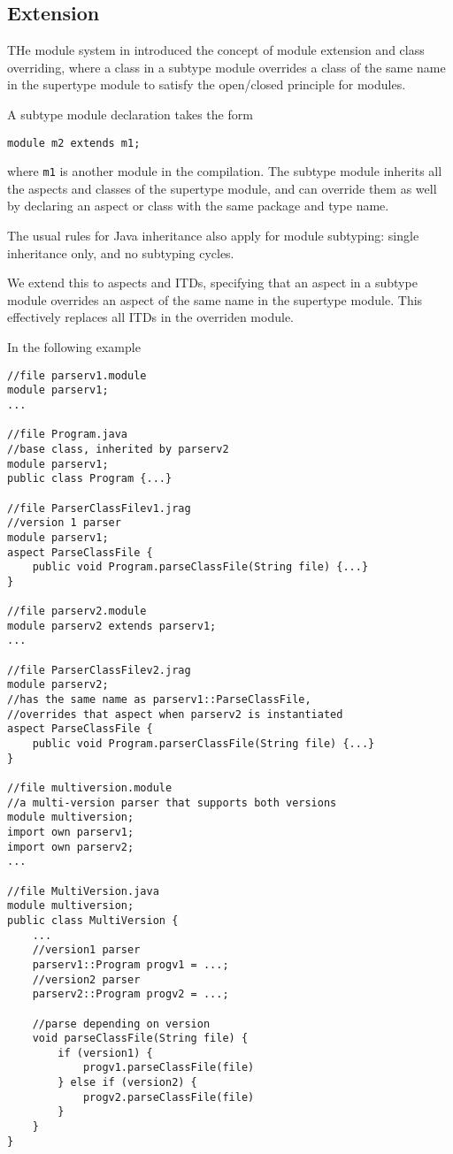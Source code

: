 \subsection{Extension}

THe module system in \cite{modulesastypes} introduced the concept of
module extension and class overriding, where a class in a subtype module
overrides a class of the same name in the supertype module to satisfy the 
open/closed principle for modules.

A subtype module declaration takes the form
\begin{lstlisting}
module m2 extends m1;
\end{lstlisting}
where \texttt{m1} is another module in the compilation. The subtype module
inherits all the aspects and classes of the supertype module, and can override
them as well by declaring an aspect or class with the same package and type name.

The usual rules for Java inheritance also apply for module subtyping: single 
inheritance only, and no subtyping cycles.

We extend this to aspects and ITDs, specifying that an aspect in a subtype module
overrides an aspect of the same name in the supertype module. This effectively
replaces all ITDs in the overriden module.

In the following example

\begin{lstlisting}
//file parserv1.module
module parserv1;
...

//file Program.java
//base class, inherited by parserv2
module parserv1;
public class Program {...}

//file ParserClassFilev1.jrag
//version 1 parser
module parserv1;
aspect ParseClassFile {
	public void Program.parseClassFile(String file) {...}
}

//file parserv2.module
module parserv2 extends parserv1;
...

//file ParserClassFilev2.jrag
module parserv2;
//has the same name as parserv1::ParseClassFile, 
//overrides that aspect when parserv2 is instantiated
aspect ParseClassFile {
	public void Program.parserClassFile(String file) {...}
}

//file multiversion.module
//a multi-version parser that supports both versions
module multiversion;
import own parserv1;
import own parserv2;
...

//file MultiVersion.java
module multiversion;
public class MultiVersion {
	...
	//version1 parser
	parserv1::Program progv1 = ...;
	//version2 parser
	parserv2::Program progv2 = ...;
	
	//parse depending on version
	void parseClassFile(String file) {
		if (version1) {
			progv1.parseClassFile(file)
		} else if (version2) {
			progv2.parseClassFile(file)
		}
	}
}
\end{lstlisting}

